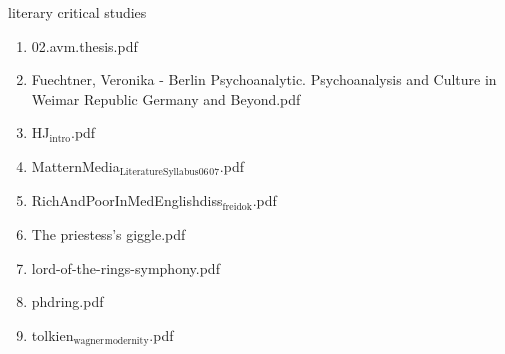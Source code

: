\documentclass[11pt]{article}
\begin{document}
\item literary critical studies
\label{sec-1-1-1-1-11-23}
\begin{enumerate}
\item 02.avm.thesis.pdf
\label{sec-1-1-1-1-11-23-1}

\item Fuechtner, Veronika - Berlin Psychoanalytic. Psychoanalysis and Culture in Weimar Republic Germany and Beyond.pdf
\label{sec-1-1-1-1-11-23-2}

\item HJ$_{\text{intro}}$.pdf
\label{sec-1-1-1-1-11-23-3}

\item MatternMedia$_{\text{LiteratureSyllabus06}}$$_{\text{07}}$.pdf
\label{sec-1-1-1-1-11-23-4}

\item RichAndPoorInMedEnglishdiss$_{\text{freidok}}$.pdf
\label{sec-1-1-1-1-11-23-5}

\item The priestess’s giggle.pdf
\label{sec-1-1-1-1-11-23-6}

\item lord-of-the-rings-symphony.pdf
\label{sec-1-1-1-1-11-23-7}

\item phdring.pdf
\label{sec-1-1-1-1-11-23-8}

\item tolkien$_{\text{wagner}}$$_{\text{modernity}}$.pdf
\label{sec-1-1-1-1-11-23-9}
\end{enumerate}
\end{document}
